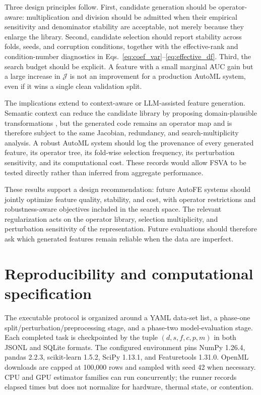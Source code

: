 \documentclass[preprint,12pt]{elsarticle}
\begin{document}
Three design principles follow.  First, candidate generation should be operator-aware: multiplication and division should be admitted when their empirical sensitivity and denominator stability are acceptable, not merely because they enlarge the library.  Second, candidate selection should report stability across folds, seeds, and corruption conditions, together with the effective-rank and condition-number diagnostics in Eqs.~\eqref{eq:coef_var}--\eqref{eq:effective_df}.  Third, the search budget should be explicit.  A feature with a small marginal AUC gain but a large increase in $\mathcal{J}$ is not an improvement for a production AutoML system, even if it wins a single clean validation split.

The implications extend to context-aware or LLM-assisted feature generation.  Semantic context can reduce the candidate library by proposing domain-plausible transformations \citep{muller2023}, but the generated code remains an operator map and is therefore subject to the same Jacobian, redundancy, and search-multiplicity analysis.  A robust AutoML system should log the provenance of every generated feature, its operator tree, its fold-wise selection frequency, its perturbation sensitivity, and its computational cost.  These records would allow FSVA to be tested directly rather than inferred from aggregate performance.

These results support a design recommendation: future AutoFE systems should jointly optimize feature quality, stability, and cost, with operator restrictions and robustness-aware objectives included in the search space.  The relevant regularization acts on the operator library, selection multiplicity, and perturbation sensitivity of the representation.  Future evaluations should therefore ask which generated features remain reliable when the data are imperfect.

\section{Reproducibility and computational specification}
\label{sec:reproducibility}

The executable protocol is organized around a YAML data-set list, a phase-one split/perturbation/preprocessing stage, and a phase-two model-evaluation stage.  Each completed task is checkpointed by the tuple $(d,s,f,c,p,m)$ in both JSONL and SQLite formats.  The configured environment pins NumPy 1.26.4, pandas 2.2.3, scikit-learn 1.5.2, SciPy 1.13.1, and Featuretools 1.31.0.  OpenML downloads are capped at 100,000 rows and sampled with seed 42 when necessary.  CPU and GPU estimator families can run concurrently; the runner records elapsed times but does not normalize for hardware, thermal state, or contention.
\end{document}
